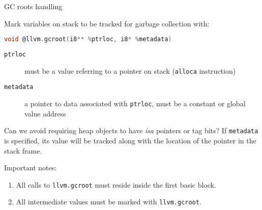 \documentclass[8pt]{beamer}
\begin{document}
\begin{frame}[fragile]{GC roots handling}
  \begin{block}{Mark variables on stack to be tracked for garbage collection with:}
    \begin{lstlisting}[language=C,basicstyle=\ttfamily,numbers=none]
      void @llvm.gcroot(i8** %ptrloc, i8* %metadata)
    \end{lstlisting}
    \begin{description}
      \item[\texttt{ptrloc}] must be a value referring to a pointer on stack
        (\texttt{alloca} instruction)
      \item[\texttt{metadata}] a pointer to data associated with
        \texttt{ptrloc}, must be a constant or global value address
    \end{description}
  \end{block}

  \begin{block}{Can we avoid requiring heap objects to have \emph{isa} pointers
      or tag bits?}
    If \texttt{metadata} is specified, its value will be tracked along with the
    location of the pointer in the stack frame.
  \end{block}

  \begin{alertblock}{Important notes:}
    \begin{enumerate}
      \item All calls to \verb|llvm.gcroot| must reside inside the first basic
        block.
      \item All intermediate values must be marked with \verb|llvm.gcroot|.
    \end{enumerate}
  \end{alertblock}
\end{frame}
\end{document}
